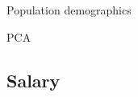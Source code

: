 \documentclass[12pt]{beamer}
\begin{document}
\begin{frame}{\textcolor{bscuro}{Population demographics}}
	\begin{figure}[!ht] 
		\centering
	\end{figure}
\end{frame}

\begin{frame}{\textcolor{bscuro}{PCA}}
\begin{figure}[!ht] 
	\centering
\end{figure}
\end{frame}


\subsection{Salary} 
\end{document}
